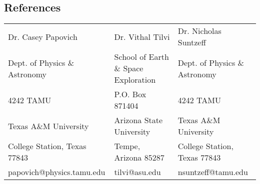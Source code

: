 \documentclass[margin,line, 11pt]{Boada_res}
\begin{document}
\begin{resume}
\section{\sc References}
\begin{tabular}{@{}p{2in}p{2in}p{2in}}
		Dr. Casey Papovich & Dr. Vithal Tilvi & Dr. Nicholas Suntzeff \\
		Dept. of Physics \& Astronomy & School of Earth \& Space Exploration & Dept. of Physics \& Astronomy \\
		4242 TAMU & P.O. Box 871404 & 4242 TAMU \\
		Texas A\&M University & Arizona State University & Texas A\&M University\\
		College Station, Texas 77843 & Tempe, Arizona 85287 & College Station, Texas 77843 \\
		papovich@physics.tamu.edu & tilvi@asu.edu & nsuntzeff@tamu.edu   
\end{tabular}

\end{resume}
\end{document}
